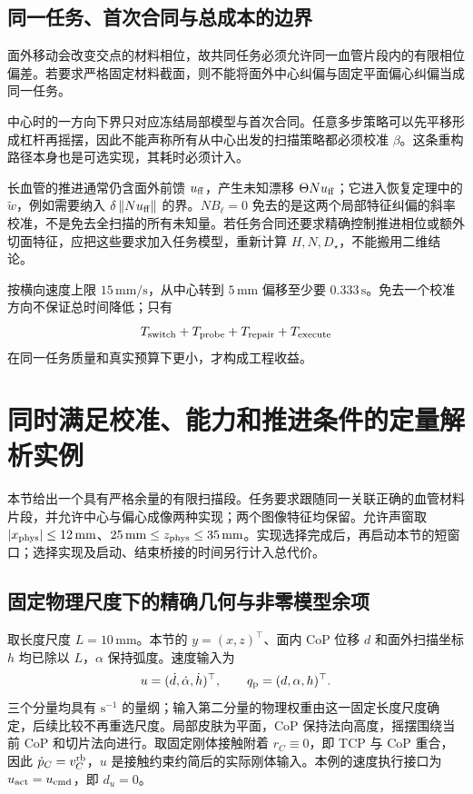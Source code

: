 \documentclass[11pt,a4paper]{article}
\numberwithin{equation}{section}
\theoremstyle{definition}
\newcommand{\norm}[1]{\left\lVert#1\right\rVert}
\begin{document}
\subsection{同一任务、首次合同与总成本的边界}
面外移动会改变交点的材料相位，故共同任务必须允许同一血管片段内的有限相位偏差。若要求严格固定材料截面，则不能将面外中心纠偏与固定平面偏心纠偏当成同一任务。

中心时的一方向下界只对应冻结局部模型与首次合同。任意多步策略可以先平移形成杠杆再摇摆，因此不能声称所有从中心出发的扫描策略都必须校准 $\beta$。这条重构路径本身也是可选实现，其耗时必须计入。

长血管的推进通常仍含面外前馈 $u_{\rm ff}$，产生未知漂移 $\Theta Nu_{\rm ff}$；它进入恢复定理中的 $\widetilde w$，例如需要纳入 $\delta\norm{Nu_{\rm ff}}$ 的界。$NB_\ell=0$ 免去的是这两个局部特征纠偏的斜率校准，不是免去全扫描的所有未知量。若任务合同还要求精确控制推进相位或额外切面特征，应把这些要求加入任务模型，重新计算 $H,N,D_\star$，不能搬用二维结论。

按横向速度上限 $15\,\mathrm{mm/s}$，从中心转到 $5\,\mathrm{mm}$ 偏移至少要 $0.333\,\mathrm{s}$。免去一个校准方向不保证总时间降低；只有
\begin{equation}
 T_{\rm switch}+T_{\rm probe}+T_{\rm repair}+T_{\rm execute}
\end{equation}
在同一任务质量和真实预算下更小，才构成工程收益。



\section{同时满足校准、能力和推进条件的定量解析实例}
\label{rev:quantitative-example}

本节给出一个具有严格余量的有限扫描段。任务要求跟随同一关联正确的血管材料片段，并允许中心与偏心成像两种实现；两个图像特征均保留。允许声窗取 $|x_{\rm phys}|\le12\,\mathrm{mm}$、$25\,\mathrm{mm}\le z_{\rm phys}\le35\,\mathrm{mm}$。实现选择完成后，再启动本节的短窗口；选择实现及启动、结束桥接的时间另行计入总代价。

\subsection{固定物理尺度下的精确几何与非零模型余项}
取长度尺度 $L=10\,\mathrm{mm}$。本节的 $y=(x,z)^\top$、面内 CoP 位移 $d$ 和面外扫描坐标 $h$ 均已除以 $L$，$\alpha$ 保持弧度。速度输入为
\begin{equation}
 u=(\dot d,\dot\alpha,\dot h)^\top,
 \qquad q_{\rm p}=(d,\alpha,h)^\top.
 \label{rev:example-units}
\end{equation}
三个分量均具有 $\mathrm{s}^{-1}$ 的量纲；输入第二分量的物理权重由这一固定长度尺度确定，后续比较不再重选尺度。局部皮肤为平面，CoP 保持法向高度，摇摆围绕当前 CoP 和切片法向进行。取固定刚体接触附着 $r_C\equiv0$，即 TCP 与 CoP 重合，因此 $\dot p_C=v_C^{\rm rb}$，$u$ 是接触约束约简后的实际刚体输入。本例的速度执行接口为 $u_{\rm act}=u_{\rm cmd}$，即 $d_u=0$。
\end{document}
